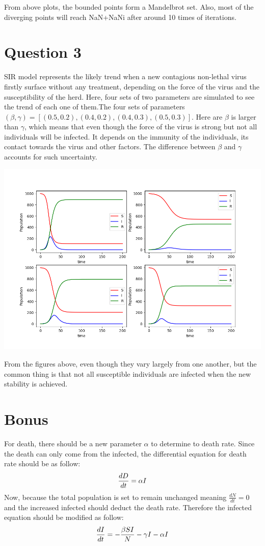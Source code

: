 \documentclass{article}
\begin{document}
From above plots, the bounded points form a Mandelbrot set. Also, most of the diverging points will reach NaN+NaNi after around 10 times of iterations.

\section{Question 3}
SIR model represents the likely trend when a new contagious non-lethal virus firstly surface without any treatment, depending on the force of the virus and the susceptibility of the herd. Here, four sets of two parameters are simulated to see the trend of each one of them.The four sets of parameters $(\beta,\gamma)=[(0.5,0.2),(0.4,0.2),(0.4,0.3),(0.5,0.3)]$. Here are $\beta$ is larger than $\gamma$, which means that even though the force of the virus is strong but not all individuals will be infected. It depends on the immunity of the individuals, its contact towards the virus and other factors. The difference between $\beta$ and $\gamma$ accounts for such uncertainty. 

\includegraphics[scale=0.4]{Question_3(a).png}

From the figures above, even though they vary largely from one another, but the common thing is that not all susceptible individuals are infected when the new stability is achieved.

\section{Bonus}

For death, there should be a new parameter $\alpha$ to determine to death rate. Since the death can only come from the infected, the differential equation for death rate should be as follow:
\begin{equation}
    \large\frac{dD}{dt} =\alpha I
\end{equation}
Now, because the total population is set to remain unchanged meaning $\frac{dN}{dt}=0$ and the increased infected should deduct the death rate. Therefore the infected equation should be modified as follow:
\begin{equation}
    \large\frac{dI}{dt}=-\frac{\beta SI}{N} -\gamma I -\alpha I
\end{equation}
\end{document}

